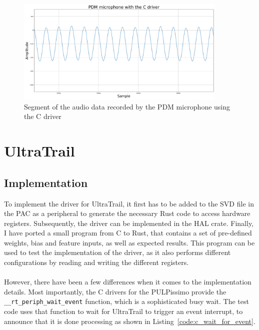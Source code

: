 \begin{figure}[H]
    \centering
    \includegraphics[width=0.9\textwidth]{figures/pdm/pdm_c.png}
    \caption[Segment of the audio data recorded by the PDM microphone using the C driver]{Segment of the audio data recorded by the PDM microphone using the C driver}
    \label{fig:pdm_c}
\end{figure}

\begin{minipage}{\textwidth}
\section{UltraTrail}

\subsection{Implementation}

To implement the driver for UltraTrail, it first has to be added to the SVD file in the PAC
as a peripheral to generate the necessary Rust code to access hardware registers.
Subsequently, the driver can be implemented in the HAL crate.
Finally, I have ported a small program from C to Rust, that contains a set of pre-defined
weights, bias and feature inputs, as well as expected results.
This program can be used to test the implementation of the driver, as it also
performs different configurations by reading and writing the different registers.
\\\\
However, there have been a few differences when it comes to the implementation details.
Most importantly, the C drivers for the PULPissimo provide the \lstinline{__rt_periph_wait_event} function,
which is a sophisticated busy wait.
The test code uses that function to wait for UltraTrail to trigger an event interrupt, to announce that
it is done processing as shown in Listing~\ref{code:c_wait_for_event}.
\end{minipage}

